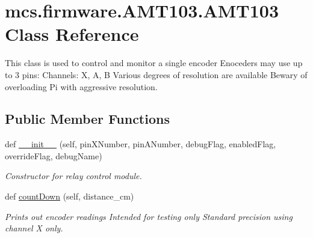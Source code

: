 \hypertarget{classmcs_1_1firmware_1_1AMT103_1_1AMT103}{}\section{mcs.\+firmware.\+A\+M\+T103.\+A\+M\+T103 Class Reference}
\label{classmcs_1_1firmware_1_1AMT103_1_1AMT103}


This class is used to control and monitor a single encoder Enoceders may use up to 3 pins\+: Channels\+: X, A, B Various degrees of resolution are available Bewary of overloading Pi with aggressive resolution.  


\subsection*{Public Member Functions}
\begin{DoxyCompactItemize}
\item 
def \hyperlink{classmcs_1_1firmware_1_1AMT103_1_1AMT103_a11608d8fb67ad83c74feb8f81aa84391}{\+\_\+\+\_\+init\+\_\+\+\_\+} (self, pin\+X\+Number, pin\+A\+Number, debug\+Flag, enabled\+Flag, override\+Flag, debug\+Name)
\begin{DoxyCompactList}\small\item\em Constructor for relay control module. \end{DoxyCompactList}\item 
\mbox{\label{classmcs_1_1firmware_1_1AMT103_1_1AMT103_a97d6ba22a18b6d03cea5f6da60f1c6e8}} 
def \hyperlink{classmcs_1_1firmware_1_1AMT103_1_1AMT103_a97d6ba22a18b6d03cea5f6da60f1c6e8}{count\+Down} (self, distance\+\_\+cm)
\begin{DoxyCompactList}\small\item\em Prints out encoder readings Intended for testing only Standard precision using channel X only. \end{DoxyCompactList}\end{DoxyCompactItemize}

